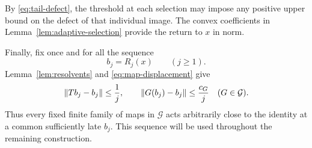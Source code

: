 By \eqref{eq:tail-defect}, the threshold at each selection may impose
any positive upper bound on the defect of that individual image.
The convex coefficients in Lemma~\ref{lem:adaptive-selection} provide
the return to $x$ in norm.

Finally, fix once and for all the sequence
\begin{equation}
\label{eq:terminal-sequence}
 b_j=R_j(x)\qquad(j\geq1).
\end{equation}
Lemma~\ref{lem:resolvents} and \eqref{eq:map-displacement} give
\begin{equation}
\label{eq:terminal-displacement}
 \lVert Tb_j-b_j\rVert\leq\frac1j,
 \qquad
 \lVert G(b_j)-b_j\rVert\leq\frac{c_G}{j}
 \quad(G\in\mathcal G).
\end{equation}
Thus every fixed finite family of maps in $\mathcal G$ acts
arbitrarily close to the identity at a common sufficiently late
$b_j$.  This sequence will be used throughout the remaining
construction.
